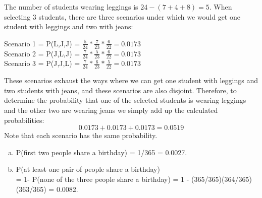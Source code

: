 %

{
The number of students wearing leggings is $24 - (7+4+8) = 5$. When selecting 3 students, there are three scenarios under which we would get one student with leggings and two with jeans: \\
\begin{center}
Scenario 1 = P(L,J,J) = $\frac{5}{24} * \frac{7}{23} * \frac{6}{22} = 0.0173$ \\
Scenario 2 = P(J,L,J) = $\frac{7}{24} * \frac{5}{23} * \frac{6}{22} = 0.0173$ \\
Scenario 3 = P(J,J,L) = $\frac{7}{24} * \frac{6}{23} * \frac{5}{22} = 0.0173$ \\
\end{center}
These scenarios exhaust the ways where we can get one student with leggings and two students with jeans, and these scenarios are also disjoint. Therefore, to determine the probability that one of the selected students is wearing leggings and the other two are wearing jeans we simply add up the calculated probabilities:
\[ 0.0173 + 0.0173 + 0.0173 = 0.0519 \]
Note that each scenario has the same probability.
}

%

{
\begin{enumerate}[(a)]
\item P(first two people share a birthday) = 1/365 = 0.0027.
\item P(at least one pair of people share a birthday) \\
= 1- P(none of the three people share a birthday) = 1 - (365/365)(364/365)(363/365) = 0.0082.
\end{enumerate}
}


